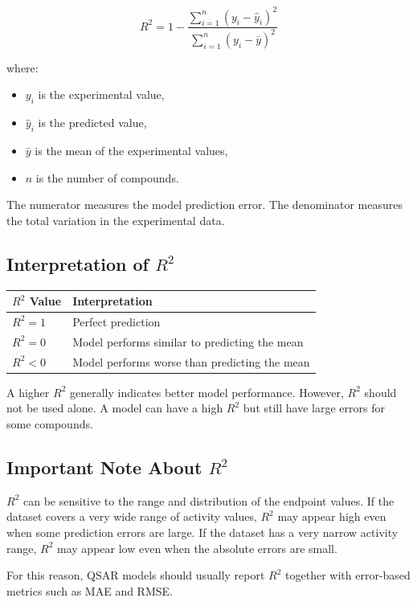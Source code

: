 \documentclass[11pt]{report}
\newenvironment{Important note}{\begin{quote}\color{red}\textbf{Important note:} }{\end{quote}}
\begin{document}
\[
R^2 = 1 - \frac{\sum_{i=1}^{n}(y_i - \hat{y}_i)^2}
{\sum_{i=1}^{n}(y_i - \bar{y})^2}
\]

where:

\begin{itemize}[leftmargin=*]
    \item $y_i$ is the experimental value,
    \item $\hat{y}_i$ is the predicted value,
    \item $\bar{y}$ is the mean of the experimental values,
    \item $n$ is the number of compounds.
\end{itemize}

The numerator measures the model prediction error. The denominator measures the total variation in the experimental data.

\subsection*{Interpretation of $R^2$}

\begin{center}
\begin{tabular}{ll}
\toprule
\textbf{$R^2$ Value} & \textbf{Interpretation} \\
\midrule
$R^2 = 1$ & Perfect prediction \\
$R^2 = 0$ & Model performs similar to predicting the mean \\
$R^2 < 0$ & Model performs worse than predicting the mean \\
\bottomrule
\end{tabular}
\end{center}

A higher $R^2$ generally indicates better model performance. However, $R^2$ should not be used alone. A model can have a high $R^2$ but still have large errors for some compounds.

\subsection*{Important Note About $R^2$}

$R^2$ can be sensitive to the range and distribution of the endpoint values. If the dataset covers a very wide range of activity values, $R^2$ may appear high even when some prediction errors are large. If the dataset has a very narrow activity range, $R^2$ may appear low even when the absolute errors are small.

For this reason, QSAR models should usually report $R^2$ together with error-based metrics such as MAE and RMSE.
\end{document}
